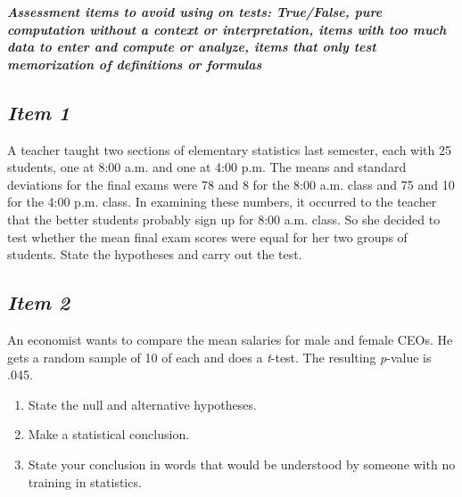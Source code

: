 \documentclass[twoside,openany]{tufte-book}
\begin{document}
\textbf{\textit{Assessment items to avoid using on tests: True/False, pure computation without a context or interpretation, items with too much data to enter and compute or analyze, items that only test memorization of definitions or formulas}}

\subsection{\textbf{\textit{Item 1}}}
A teacher taught two sections of elementary statistics last semester, each with 25 students, one at 8:00 a.m. and one at 4:00 p.m. The means and standard deviations for the final exams were 78 and 8 for the 8:00 a.m. class and 75 and 10 for the 4:00 p.m. class. In examining these numbers, it occurred to the teacher that the better students probably sign up for 8:00 a.m. class. So she decided to test whether the mean final exam scores were equal for her two groups of students. State the hypotheses and carry out the test.

 

\subsection{\textbf{\textit{Item 2}}}
An economist wants to compare  the mean salaries for male and female CEOs. He gets a random sample of 10 of each and does a \textit{t}-test. The resulting \textit{p}-value is .045.
\begin{enumerate} [leftmargin=1cm, itemsep=.2em]

\item State the null and alternative hypotheses.
\item Make a statistical conclusion.
\item State your conclusion in words that would be understood by someone with no training in statistics.
\end{enumerate}

\newpage
\end{document}
